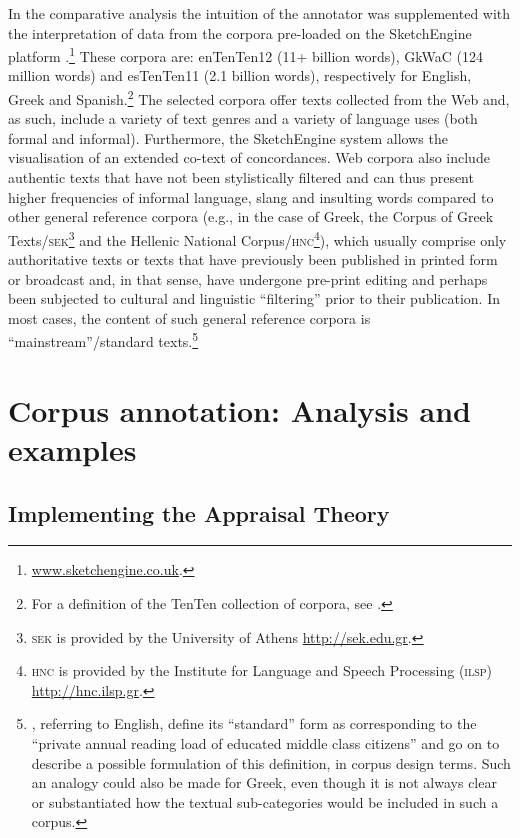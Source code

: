 \documentclass[output=paper]{LSP/langsci}
\begin{document}
In the comparative analysis the intuition of the annotator was supplemented with the interpretation of data from the corpora pre-loaded on the SketchEngine platform \citep{Kilgarriff2004}.\footnote{\url{www.sketchengine.co.uk}.} These corpora are: enTenTen12 (11+ billion words), GkWaC (124 million words) and esTenTen11 (2.1 billion words), respectively for English, Greek and Spanish.\footnote{For a definition of the TenTen collection of corpora, see \citet{ Jakubicek2013}.} The selected corpora offer texts collected from the Web and, as such, include a variety of text genres and a variety of language uses (both formal and informal). Furthermore, the SketchEngine system allows the visualisation of an extended co-text of concordances. Web corpora also include authentic texts that have not been stylistically filtered and can thus present higher frequencies of informal language, slang and insulting words compared to other general reference corpora (e.g., in the case of Greek, the Corpus of Greek Texts/\textsc{sek}\footnote{\textsc{sek} is provided by the University of Athens \url{http://sek.edu.gr}.} and the Hellenic National Corpus/\textsc{hnc}\footnote{\textsc{hnc} is provided by the Institute for Language and Speech Processing (\textsc{ilsp}) \url{http://hnc.ilsp.gr}.}), which usually comprise only authoritative texts or texts that have previously been published in printed form or broadcast and, in that sense, have undergone pre-print editing and perhaps been subjected to cultural and linguistic “filtering” prior to their publication. In most cases, the content of such general reference corpora is “mainstream”/standard texts.\footnote{\citet[65--66]{Teubert2007}, referring to English, define its “standard” form as corresponding to the “private annual reading load of educated middle class citizens” and go on to describe a possible formulation of this definition, in corpus design terms. Such an analogy could also be made for Greek, even though it is not always clear or substantiated how the textual sub-categories would be included in such a corpus.}

\section{Corpus annotation: Analysis and examples} \label{sec:2:4} 
\subsection{Implementing the Appraisal Theory} \label{sec:2:4:1}
\end{document}
